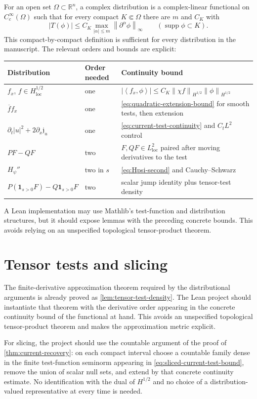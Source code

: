 \documentclass[11pt,oneside]{book}
\theoremstyle{definition}
\theoremstyle{remark}
\newcommand{\R}{\mathbb R}
\newcommand{\supp}{\operatorname{supp}}
\newcommand{\1}{\mathbf 1}
\newcommand{\loc}{\mathrm{loc}}
\newcommand{\norm}[1]{\left\lVert #1\right\rVert}
\newcommand{\pair}[2]{\left\langle #1,#2\right\rangle}
\begin{document}
For an open set $\Omega\subset\R^n$, a complex distribution is a
complex-linear functional on $C_c^\infty(\Omega)$ such that for every compact
$K\Subset\Omega$ there are $m$ and $C_K$ with
\[
 |T(\phi)|\le C_K\max_{|\alpha|\le m}\norm{\partial^\alpha\phi}_\infty
 \qquad(\supp\phi\subset K).
\]
This compact-by-compact definition is sufficient for every distribution in
the manuscript.  The relevant orders and bounds are explicit:
\begin{longtable}{p{}p{}p{}}
\toprule
Distribution & Order needed & Continuity bound\\
\midrule
\endhead
$f_x$, $f\in H^{1/2}_{\loc}$ & one &
$|\pair{f_x}{\phi}|\le C_K\norm{\chi f}_{H^{1/2}}
\norm\phi_{H^{1/2}}$\\
$\overline f f_x$ & one &
\eqref{eq:quadratic-extension-bound} for smooth tests, then extension\\
$\partial_t|u|^2+2\partial_x\mathfrak j_u$ & one &
\eqref{eq:current-test-continuity} and $C_tL^2$ control\\
$PF-QF$ & two &
$F,QF\in L^2_{\loc}$ paired after moving derivatives to the test\\
$H_\psi''$ & two in $s$ &
\eqref{eq:Hpsi-second} and Cauchy--Schwarz\\
$P(\1_{s>0}F)-Q\1_{s>0}F$ & two &
scalar jump identity plus tensor-test density\\
\bottomrule
\end{longtable}

A Lean implementation may use Mathlib's test-function and distribution
structures, but it should expose lemmas with the preceding concrete bounds.
This avoids relying on an unspecified topological tensor-product theorem.

\section{Tensor tests and slicing}

The finite-derivative approximation theorem required by the distributional
arguments is already proved as \cref{lem:tensor-test-density}.  The Lean
project should instantiate that theorem with the derivative order appearing
in the concrete continuity bound of the functional at hand.  This avoids an
unspecified topological tensor-product theorem and makes the approximation
metric explicit.

For slicing, the project should use the countable argument of the proof of
\cref{thm:current-recovery}: on each compact interval choose a countable
family dense in the finite test-function seminorm appearing in
\eqref{eq:sliced-current-test-bound}, remove the union of scalar null sets,
and extend by that concrete continuity estimate.  No identification with the
dual of $H^{1/2}$ and no choice of a distribution-valued representative at
every time is needed.
\end{document}
